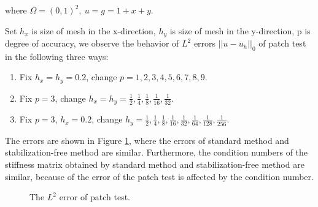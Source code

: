 \documentclass[10pt]{amsart}
\theoremstyle{definition}
\theoremstyle{remark}
\begin{document}
\begin{enumerate}[1.]
where $\Omega = (0, 1)^2, \ u = g = 1+x+y$. 

Set $h_x$ is size of mesh in the x-direction, $h_y$ is size of mesh in the
y-direction, p is degree of accuracy, 
we observe the behavior of $L^2$ errors $||u - u_h||_0$ of patch test in the following three ways:
\begin{enumerate}[(1)]
\item Fix $h_x=h_y=0.2$, change $p= 1, 2, 3, 4, 5, 6, 7, 8, 9$.
\item Fix $p=3$, change $h_x=h_y=\frac{1}{2}, \frac{1}{4}, \frac{1}{8},
    \frac{1}{16}, \frac{1}{32}$.
\item Fix $p=3$, $h_x=0.2$, change $h_y=\frac{1}{2}, \frac{1}{4}, \frac{1}{8},
    \frac{1}{16}, \frac{1}{32}, \frac{1}{64}, \frac{1}{128}, \frac{1}{256}$.
\end{enumerate}

The errors are shown in Figure \ref{fig:patchtest}, where 
the errors of standard method and stabilization-free method are similar. 
Furthermore, 
the condition numbers of the stiffness matrix obtained by
standard method and stabilization-free method are similar, because of the error
of the patch test is affected by the condition number.


\begin{figure}[h]
\centering
{}
\caption{The $L^2$ error of patch test.}
  \label{fig:patchtest} %
\end{figure}


















\end{enumerate}
\end{document}
